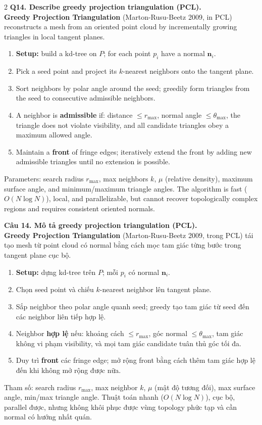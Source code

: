 \begin{paracol}{2}
\textbf{Q14. Describe greedy projection triangulation (PCL).}\\
\textbf{Greedy Projection Triangulation} (Marton-Rusu-Beetz 2009, in PCL) reconstructs a mesh from an oriented point cloud by incrementally growing triangles in local tangent planes.
\begin{enumerate}[leftmargin=*,nosep]
\item \textbf{Setup:} build a kd-tree on $P$; for each point $p_i$ have a normal $\mathbf{n}_i$.
\item Pick a seed point and project its $k$-nearest neighbors onto the tangent plane.
\item Sort neighbors by polar angle around the seed; greedily form triangles from the seed to consecutive admissible neighbors.
\item A neighbor is \textbf{admissible} if: distance $\le r_{\max}$, normal angle $\le \theta_{\max}$, the triangle does not violate visibility, and all candidate triangles obey a maximum allowed angle.
\item Maintain a \textbf{front} of fringe edges; iteratively extend the front by adding new admissible triangles until no extension is possible.
\end{enumerate}
Parameters: search radius $r_{\max}$, max neighbors $k$, $\mu$ (relative density), maximum surface angle, and minimum/maximum triangle angles. The algorithm is fast ($O(N \log N)$), local, and parallelizable, but cannot recover topologically complex regions and requires consistent oriented normals.

\switchcolumn

\textbf{Câu 14. Mô tả greedy projection triangulation (PCL).}\\
\textbf{Greedy Projection Triangulation} (Marton-Rusu-Beetz 2009, trong PCL) tái tạo mesh từ point cloud có normal bằng cách mọc tam giác từng bước trong tangent plane cục bộ.
\begin{enumerate}[leftmargin=*,nosep]
\item \textbf{Setup:} dựng kd-tree trên $P$; mỗi $p_i$ có normal $\mathbf{n}_i$.
\item Chọn seed point và chiếu $k$-nearest neighbor lên tangent plane.
\item Sắp neighbor theo polar angle quanh seed; greedy tạo tam giác từ seed đến các neighbor liên tiếp hợp lệ.
\item Neighbor \textbf{hợp lệ} nếu: khoảng cách $\le r_{\max}$, góc normal $\le \theta_{\max}$, tam giác không vi phạm visibility, và mọi tam giác candidate tuân thủ góc tối đa.
\item Duy trì \textbf{front} các fringe edge; mở rộng front bằng cách thêm tam giác hợp lệ đến khi không mở rộng được nữa.
\end{enumerate}
Tham số: search radius $r_{\max}$, max neighbor $k$, $\mu$ (mật độ tương đối), max surface angle, min/max triangle angle. Thuật toán nhanh ($O(N \log N)$), cục bộ, parallel được, nhưng không khôi phục được vùng topology phức tạp và cần normal có hướng nhất quán.


\end{paracol}
